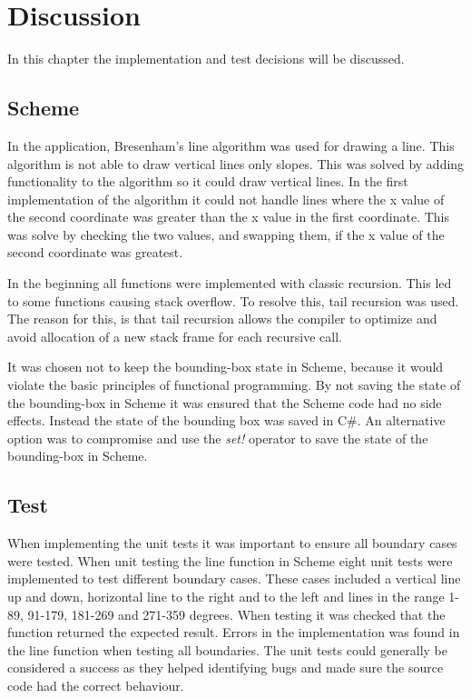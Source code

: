 \chapter{Discussion}
\label{chp:disc}

In this chapter the implementation and test decisions will be discussed. 

\section{Scheme}
In the application, Bresenham’s line algorithm was used for drawing a line. This algorithm is not able to draw vertical lines only slopes. This was solved by adding functionality to the algorithm so it could draw vertical lines. In the first implementation of the algorithm it could not handle lines where the x value of the second coordinate was greater than the x value in the first coordinate. This was solve by checking the two values, and swapping them, if the x value of the second coordinate was greatest.

In the beginning all functions were implemented with classic recursion. This led to some functions causing stack overflow. To resolve this, tail recursion was used. The reason for this, is that tail recursion allows the compiler to optimize and avoid allocation of a new stack frame for each recursive call. 

It was chosen not to keep the bounding-box state in Scheme, because it would violate the basic principles of functional programming. By not saving the state of the bounding-box in Scheme it was ensured that the Scheme code had no side effects. Instead the state of the bounding box was saved in C\#. An alternative option was to compromise and use the \emph{set!} operator to save the state of the bounding-box in Scheme.

\section{Test}

When implementing the unit tests it was important to ensure all boundary cases were tested. When unit testing the line function in Scheme eight unit tests were implemented to test different boundary cases. These cases included a vertical line up and down, horizontal line to the right and to the left and lines in the range 1-89, 91-179, 181-269 and 271-359 degrees. When testing it was checked that the function returned the expected result. Errors in the implementation was found in the line function when testing all boundaries. The unit tests could generally be considered a success as they helped identifying bugs and made sure the source code had the correct behaviour.

